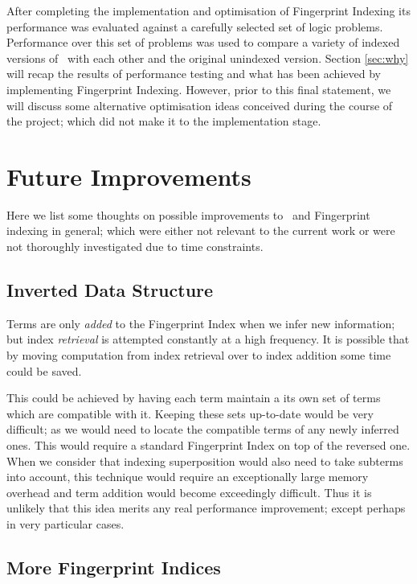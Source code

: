 After completing the implementation and optimisation of Fingerprint Indexing its performance
was evaluated against a carefully selected set of logic problems. Performance over this
set of problems was used to compare a variety of indexed versions of \beagle\ with each other and the original unindexed version. 
Section \ref{sec:why} will recap the results of performance testing and what
has been achieved by implementing Fingerprint Indexing. However, prior to this final statement,
we will discuss some alternative optimisation ideas conceived during the course of the project;
which did not make it to the implementation stage.

\section{Future Improvements}
\label{sec:future}

Here we list some thoughts on possible improvements to \beagle\ and Fingerprint
indexing in general; which were either not relevant to the current work or
were not thoroughly investigated due to time constraints.


\subsection{Inverted Data Structure}
\label{sec:refd}

Terms are only \emph{added} to the Fingerprint Index when we infer new information;
but index \emph{retrieval} is attempted constantly at a high frequency. It is possible
that by moving computation from index retrieval over to index addition some time could
be saved.

This could be achieved by having each term maintain a its own set of terms which
are compatible with it. Keeping these sets up-to-date would be very difficult; as we would
need to locate the compatible terms of any newly inferred ones. This would require a standard
Fingerprint Index on top of the reversed one. When we consider that indexing superposition
would also need to take subterms into account, this technique would require
an exceptionally large memory overhead and term addition would become exceedingly difficult.
Thus it is unlikely that this idea merits any real performance improvement; except
perhaps in very particular cases.

\subsection{More Fingerprint Indices}

